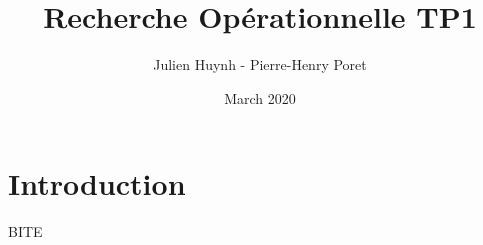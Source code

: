 \documentclass{article}
\title{Recherche Opérationnelle TP1}
\author{Julien Huynh - Pierre-Henry Poret }
\date{March 2020}
\begin{document}
\maketitle

\section{Introduction}

BITE
\end{document}
